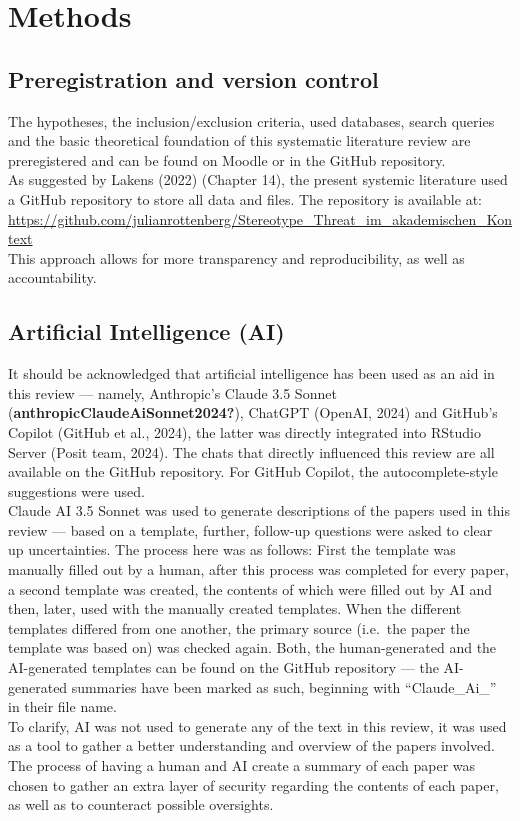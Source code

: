 \documentclass[
  stu, a4paper,floatsintext]{apa7}
\begin{document}
\section{Methods}\label{methods}

\subsection{Preregistration and version control}\label{preregistration-and-version-control}

The hypotheses, the inclusion/exclusion criteria, used databases, search queries and the basic theoretical foundation of this systematic literature review are preregistered and can be found on Moodle or in the GitHub repository.\\
As suggested by Lakens (2022) (Chapter 14), the present systemic literature used a GitHub repository to store all data and files. The repository is available at: \url{https://github.com/julianrottenberg/Stereotype_Threat_im_akademischen_Kontext}\\
This approach allows for more transparency and reproducibility, as well as accountability.

\subsection{Artificial Intelligence (AI)}\label{artificial-intelligence-ai}

It should be acknowledged that artificial intelligence has been used as an aid in this review --- namely, Anthropic's Claude 3.5 Sonnet (\textbf{anthropicClaudeAiSonnet2024?}), ChatGPT (OpenAI, 2024) and GitHub's Copilot (GitHub et al., 2024), the latter was directly integrated into RStudio Server (Posit team, 2024). The chats that directly influenced this review are all available on the GitHub repository.
For GitHub Copilot, the autocomplete-style suggestions were used.\\
Claude AI 3.5 Sonnet was used to generate descriptions of the papers used in this review --- based on a template, further, follow-up questions were asked to clear up uncertainties.
The process here was as follows: First the template was manually filled out by a human, after this process was completed for every paper, a second template was created, the contents of which were filled out by AI and then, later, used with the manually created templates. When the different templates differed from one another, the primary source (i.e.~the paper the template was based on) was checked again. Both, the human-generated and the AI-generated templates can be found on the GitHub repository --- the AI-generated summaries have been marked as such, beginning with ``Claude\_Ai\_'' in their file name.\\
To clarify, AI was not used to generate any of the text in this review, it was used as a tool to gather a better understanding and overview of the papers involved. The process of having a human and AI create a summary of each paper was chosen to gather an extra layer of security regarding the contents of each paper, as well as to counteract possible oversights.
\end{document}
